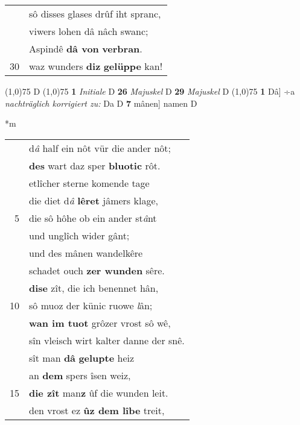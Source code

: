 \documentclass[8pt,a4paper,notitlepage]{article}
\begin{document}
\begin{table}[ht]
\begin{minipage}[t]{0.5\linewidth}
\begin{tabular}{rl}
 & sô disses glases drûf iht spranc,\\ 
 & viwers lohen dâ nâch swanc;\\ 
 & Aspindê \textbf{dâ von} \textbf{verbran}.\\ 
30 & waz wunders \textbf{diz} \textbf{gelüppe} kan!\\ 
\end{tabular}
\scriptsize
\line(1,0){75} \newline
D \newline
\line(1,0){75} \newline
\textbf{1} \textit{Initiale} D  \textbf{26} \textit{Majuskel} D  \textbf{29} \textit{Majuskel} D  \newline
\line(1,0){75} \newline
\textbf{1} Dâ] ÷a \textit{nachträglich korrigiert zu:} Da D \textbf{7} mânen] namen D \newline
\end{minipage}
\hspace{0.5cm}
\begin{minipage}[t]{0.5\linewidth}
\small
\begin{center}*m
\end{center}
\begin{tabular}{rl}
 & d\textit{â} half ein nôt vür die ander nôt;\\ 
 & \textbf{des} wart daz sper \textbf{bluotic} rôt.\\ 
 & etlîcher sterne komende tage\\ 
 & die diet d\textit{â} \textbf{lêret} jâmers klage,\\ 
5 & die sô hôhe ob ein ander st\textit{â}nt\\ 
 & und unglîch wider gânt;\\ 
 & und des mânen wandelkêre\\ 
 & schadet ouch \textbf{zer wunden} sêre.\\ 
 & \textbf{dise} zît, die ich benennet hân,\\ 
10 & sô muoz der künic ruowe \textit{l}ân;\\ 
 & \textbf{wan im tuot} grôzer vrost sô wê,\\ 
 & sîn vleisch wirt kalter danne der snê.\\ 
 & sît man \textbf{dâ} \textbf{gelupte} heiz\\ 
 & an \textbf{dem} spers îsen weiz,\\ 
15 & \textbf{die zît} man\textbf{z} ûf die wunden leit.\\ 
 & den vrost ez \textbf{ûz dem lîbe} treit,\\ 

\end{tabular}
\end{minipage}
\end{table}
\end{document}
